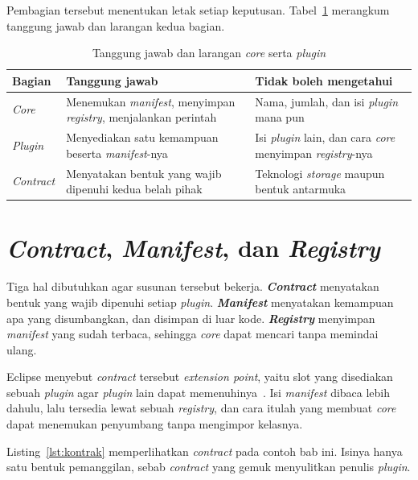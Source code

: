 Pembagian tersebut menentukan letak setiap keputusan.
Tabel~\ref{tab:inti-plugin} merangkum tanggung jawab dan larangan kedua bagian.

\begin{table}[htbp]
  \centering
  \caption{Tanggung jawab dan larangan \textit{core} serta \textit{plugin}}
  \label{tab:inti-plugin}
  \begin{tabularx}{\textwidth}{|l|X|X|}
    \hline
    \textbf{Bagian} & \textbf{Tanggung jawab} & \textbf{Tidak boleh mengetahui} \\
    \hline
    \textit{Core} & Menemukan \textit{manifest}, menyimpan \textit{registry}, menjalankan perintah & Nama, jumlah, dan isi \textit{plugin} mana pun \\
    \hline
    \textit{Plugin} & Menyediakan satu kemampuan beserta \textit{manifest}-nya & Isi \textit{plugin} lain, dan cara \textit{core} menyimpan \textit{registry}-nya \\
    \hline
    \textit{Contract} & Menyatakan bentuk yang wajib dipenuhi kedua belah pihak & Teknologi \textit{storage} maupun bentuk antarmuka \\
    \hline
  \end{tabularx}
\end{table}

\section{\textit{Contract}, \textit{Manifest}, dan \textit{Registry}}

Tiga hal dibutuhkan agar susunan tersebut bekerja.
\textbf{\textit{Contract}} menyatakan
bentuk yang wajib dipenuhi setiap \textit{plugin}.
\textbf{\textit{Manifest}} menyatakan
kemampuan apa yang disumbangkan, dan disimpan di luar kode.
\textbf{\textit{Registry}}
menyimpan \textit{manifest} yang sudah terbaca, sehingga \textit{core} dapat mencari tanpa
memindai ulang.

Eclipse menyebut \textit{contract} tersebut \textit{extension
point}, yaitu slot yang
disediakan sebuah \textit{plugin} agar \textit{plugin} lain dapat
memenuhinya~\cite{bolour2003eclipse}. Isi \textit{manifest} dibaca lebih dahulu, lalu
tersedia lewat sebuah \textit{registry}, dan cara itulah yang membuat \textit{core} dapat
menemukan penyumbang tanpa mengimpor kelasnya.

Listing~\ref{lst:kontrak} memperlihatkan \textit{contract} pada contoh bab ini. Isinya
hanya satu bentuk pemanggilan, sebab \textit{contract} yang gemuk menyulitkan penulis
\textit{plugin}.

